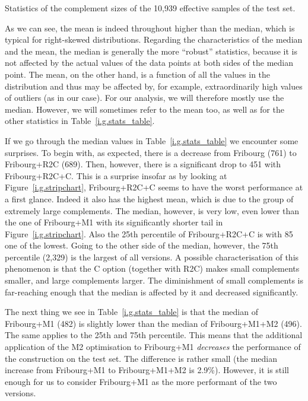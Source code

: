 \begin{table}[ht]
\centering

\caption{Statistics of the complement sizes of the 10,939 effective samples of the \goal{} test set.}
\label{i.g.stats_table}
\end{table}

As we can see, the mean is indeed throughout higher than the median, which is typical for right-skewed distributions. Regarding the characteristics of the median and the mean, the median is generally the more ``robust'' statistics, because it is not affected by the actual values of the data points at both sides of the median point. The mean, on the other hand, is a function of all the values in the distribution and thus may be affected by, for example, extraordinarily high values of outliers (as in our case). For our analysis, we will therefore mostly use the median. However, we will sometimes refer to the mean too, as well as for the other statistics in Table~\ref{i.g.stats_table}.

If we go through the median values in Table~\ref{i.g.stats_table} we encounter some surprises. To begin with, as expected, there is a decrease from Fribourg (761) to Fribourg+R2C (689). Then, however, there is a significant drop to 451 with Fribourg+R2C+C. This is a surprise insofar as by looking at Figure~\ref{i.g.stripchart}, Fribourg+R2C+C seems to have the worst performance at a first glance. Indeed it also has the highest mean, which is due to the group of extremely large complements. The median, however, is very low, even lower than the one of Fribourg+M1 with its significantly shorter tail in Figure~\ref{i.g.stripchart}. Also the 25th percentile of Fribourg+R2C+C is with 85 one of the lowest. Going to the other side of the median, however, the 75th percentile (2,329) is the largest of all versions. A possible characterisation of this phenomenon is that the C option (together with R2C) makes small complements smaller, and large complements larger. The diminishment of small complements is far-reaching enough that the median is affected by it and decreased significantly.

The next thing we see in Table~\ref{i.g.stats_table} is that the median of Fribourg+M1 (482) is slightly lower than the median of Fribourg+M1+M2 (496). The same applies to the 25th and 75th percentile. This means that the additional application of the M2 optimisation to Fribourg+M1 \textit{decreases} the performance of the construction on the \goal{} test set. The difference is rather small (the median increase from Fribourg+M1 to Fribourg+M1+M2 is 2.9\%). However, it is still enough for us to consider Fribourg+M1 as the more performant of the two versions.

